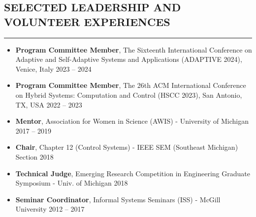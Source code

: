 \documentclass{article}
\begin{document}



\vspace{-9pt}

\subsection*{SELECTED LEADERSHIP AND VOLUNTEER EXPERIENCES}
\vspace{-2pt}
\hrule
\vspace{10pt}


\begin{itemize}
\setlength\itemsep{-2 pt}
\setlength{\itemindent}{-25 pt}
\item[] \textbf{Program Committee Member}, The Sixteenth International Conference on Adaptive and Self-Adaptive Systems and Applications (ADAPTIVE 2024), Venice, Italy \hfill 2023 -- 2024
\item[] \textbf{Program Committee Member}, The 26th ACM International Conference on Hybrid Systems: Computation and Control (HSCC 2023), San Antonio, TX, USA \hfill 2022 -- 2023
\item[] \textbf{Mentor}, Association for Women in Science (AWIS) - University of Michigan \hfill 2017 -- 2019
\item[] \textbf{Chair}, Chapter 12 (Control Systems) - IEEE SEM (Southeast Michigan) Section \hfill 2018
\item[] \textbf{Technical Judge}, Emerging Research Competition in Engineering Graduate Symposium - Univ. of Michigan \hfill 2018
\item[] \textbf{Seminar Coordinator}, Informal Systems Seminars (ISS) - McGill University \hfill 2012 -- 2017
\end{itemize}


\vspace{-12pt}
\end{document}
